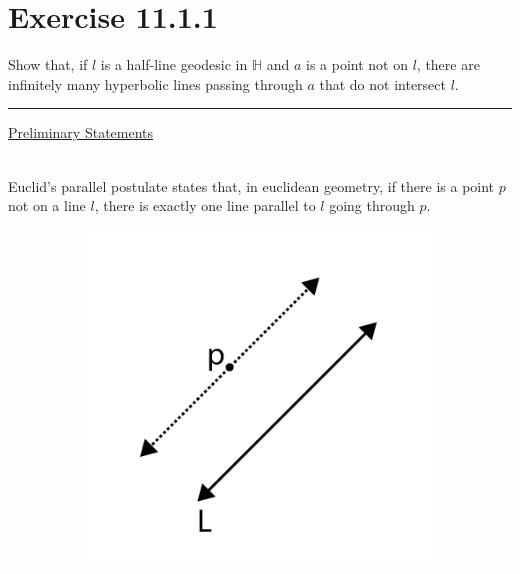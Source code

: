 \documentclass[12pt]{article}
\newcommand{\ulind}[1]
{
\noindent
\underline{#1}\\\\
\indent
}
\begin{document}
\maketitle

\section*{Exercise 11.1.1}
\indent

Show that, if $l$ is a half-line geodesic in $\mathbb{H}$ and $a$ is a point not on $l$, there are infinitely  many hyperbolic lines passing through $a$ that do not intersect $l$.

\vspace{1cm}
\hrule
\vspace{1cm}
\noindent

\ulind{Preliminary Statements}

Euclid's parallel postulate states that, in euclidean geometry, if there is a point $p$ not on a line $l$, there is exactly one line parallel to $l$ going through $p$.

\begin{figure}[h!]
  \centering
      \begin{subfigure}[b]{0.37\linewidth}
    \includegraphics[width=\linewidth]{./assets/11-1-1/parallel-postulate.png}
  \end{subfigure}
  \end{figure}
  \indent
\end{document}
